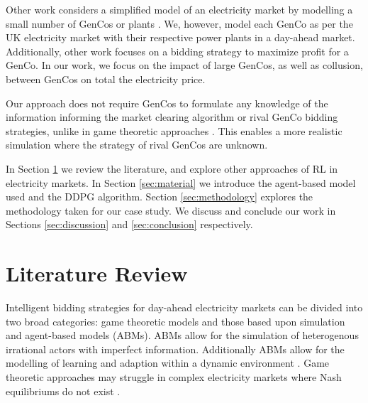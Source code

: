 \documentclass[conference]{IEEEtran}
\begin{document}
Other work considers a simplified model of an electricity market by modelling a small number of GenCos or plants \cite{EsmaeiliAliabadi2017,Tellidou2007}. We, however, model each GenCo as per the UK electricity market with their respective power plants in a day-ahead market. Additionally, other work focuses on a bidding strategy to maximize profit for a GenCo. In our work, we focus on the impact of large GenCos, as well as collusion, between GenCos on total the electricity price. 


Our approach does not require GenCos to formulate any knowledge of the information informing the market clearing algorithm or rival GenCo bidding strategies, unlike in game theoretic approaches \cite{Wang2011}. This enables a more realistic simulation where the strategy of rival GenCos are unknown.

In Section \ref{sec:lit-review} we review the literature, and explore other approaches of RL in electricity markets. In Section \ref{sec:material} we introduce the agent-based model used and the DDPG algorithm. Section \ref{sec:methodology} explores the methodology taken for our case study. We discuss and conclude our work in Sections \ref{sec:discussion} and \ref{sec:conclusion} respectively. 














\section{Literature Review}
\label{sec:lit-review}

Intelligent bidding strategies for day-ahead electricity markets can be divided into two broad categories: game theoretic models and those based upon simulation and agent-based models (ABMs). ABMs allow for the simulation of heterogenous irrational actors with imperfect information. Additionally ABMs allow for the modelling of learning and adaption within a dynamic environment \cite{EsmaeiliAliabadi2017}. Game theoretic approaches may struggle in complex electricity markets where Nash equilibriums do not exist \cite{Wang2011}.
\end{document}
